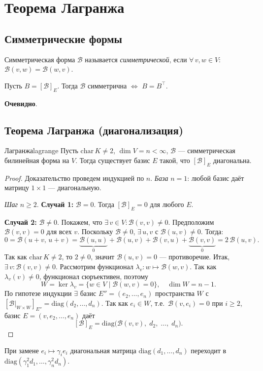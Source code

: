 \section{Теорема Лагранжа}

\subsection*{Симметрические формы}

\begin{Definition}{Симметрическая форма}{}
	$\mathcal{B}$ называется \textit{симметрической}, если $\forall\, v, w \in V$: $\mathcal{B}(v, w) = \mathcal{B}(w, v)$.
\end{Definition}

\begin{Statement}{}{}
	Пусть $B = [\mathcal{B}]_E$.
	Тогда $\mathcal{B}$ симметрична $\Longleftrightarrow$ $B = B^{\top}$.
\end{Statement}
\textbf{Очевидно}.

\subsection*{Теорема Лагранжа (диагонализация)}

\begin{Theorem}{Лагранжа}{lagrange}
	Пусть $\mathrm{char}\,K \neq 2$, $\dim V = n < \infty$, $\mathcal{B}$ — симметрическая билинейная форма на $V$.
	Тогда существует базис $E$ такой, что $[\mathcal{B}]_E$ диагональна.
\end{Theorem}

\begin{proof}
	Доказательство проведем индукцией по $n$.
	\textit{База} $n = 1$: любой базис даёт матрицу $1 \times 1$ — диагональную.

	\textit{Шаг} $n \geq 2$.
	\textbf{Случай 1:} $\mathcal{B} = 0$. Тогда $[\mathcal{B}]_E = 0$ для любого $E$.

	\textbf{Случай 2:} $\mathcal{B} \neq 0$.
	Покажем, что $\exists\, v \in V\colon \mathcal{B}(v,v) \neq 0$.
	Предположим $\mathcal{B}(v,v) = 0$ для всех $v$.
	Поскольку $\mathcal{B} \neq 0$, $\exists\, u, v$ с $\mathcal{B}(u,v) \neq 0$.
	Тогда:
	\[
	0 = \mathcal{B}(u+v,\,u+v)
	= \underbrace{\mathcal{B}(u,u)}_{0} + \mathcal{B}(u,v) + \mathcal{B}(v,u) + \underbrace{\mathcal{B}(v,v)}_{0}
	= 2\,\mathcal{B}(u,v).
	\] 
	Так как $\mathrm{char}\,K \neq 2$, то $2 \neq 0$, значит $\mathcal{B}(u,v) = 0$ — противоречие.
	Итак, $\exists\, v\colon \mathcal{B}(v,v) \neq 0$. Рассмотрим функционал $\lambda_v\colon w \mapsto \mathcal{B}(w, v)$.
	Так как $\lambda_v(v) \neq 0$, функционал сюръективен, поэтому
	\[
	W = \ker\lambda_v = \{w \in V \mid \mathcal{B}(w,v)=0\}, \quad \dim W = n-1.
	\] 
	По гипотезе индукции $\exists$ базис $E'' = (e_2,\ldots,e_n)$ пространства $W$ с
	$[\mathcal{B}|_{W\times W}]_{E''} = \mathrm{diag}(d_2,\ldots,d_n)$.
	Так как $e_i \in W$, т.е.\ $\mathcal{B}(v,e_i) = 0$ при $i \geq 2$, базис $E = (v, e_2, \ldots, e_n)$ даёт
	\[
	[\mathcal{B}]_E = \mathrm{diag}\bigl(\mathcal{B}(v,v),\; d_2,\; \ldots,\; d_n\bigr).
	\] 
\end{proof}

\begin{Remark}{}{}
	При замене $e_i \mapsto \gamma_i e_i$ диагональная матрица $\mathrm{diag}(d_1,\ldots,d_n)$ переходит в $\mathrm{diag}(\gamma_1^2 d_1,\ldots,\gamma_n^2 d_n)$.
\end{Remark}
